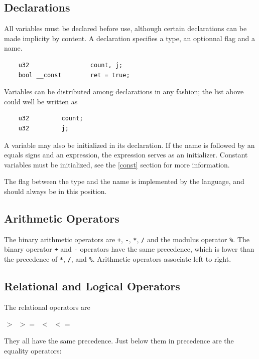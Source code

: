 \documentclass{scrartcl}
\begin{document}
        \subsection{Declarations}
            All variables must be declared before use, although certain
            declarations can be made implicity by content. A declaration
            specifies a type, an optionnal flag and a name.
            \begin{lstlisting}
    u32                 count, j;
    bool __const        ret = true;
            \end{lstlisting}
            Variables can be distributed among declarations in any fashion; the
            list above could well be written as
            \begin{lstlisting}
    u32         count;
    u32         j;
            \end{lstlisting}
            A variable may also be initialized in its declaration. If the name
            is followed by an equals signs and an expression, the expression
            serves as an initializer. Constant variables must be initialized,
            see the \ref{const} section for more information.

            The flag between the type and the name is implemented by the language,
            and should always be in this position.
        \subsection{Arithmetic Operators}
            The binary arithmetic operators are \texttt{+}, \texttt{-},
            \texttt{*}, \texttt{/} and the modulus operator \texttt{\%}.
            The binary operator \texttt{+} and \texttt{-} operators have the 
            same precedence, which is lower than the precedence of \texttt{*},
            \texttt{/}, and \texttt{\%}. Arithmetic operators associate left
            to right.
        \subsection{Relational and Logical Operators}
            The relational operators are

$\begin{array}{llll}
> & >= & < & <=
\end{array}$

            They all have the same precedence. Just below them in precedence are
            the equality operators:
\end{document}
